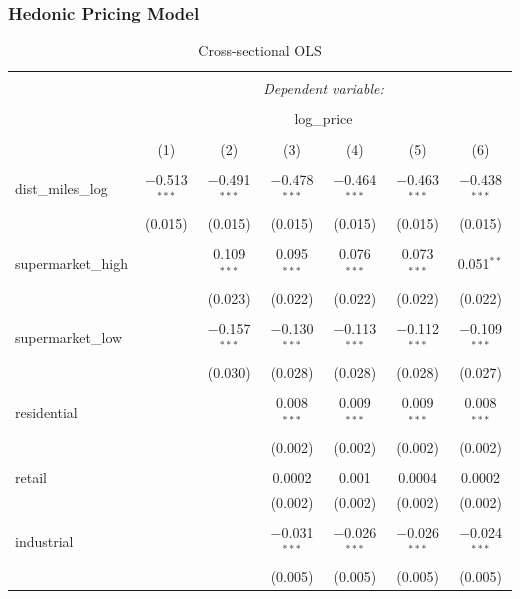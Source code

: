 \documentclass{article}
\begin{document}
\subsubsection{Hedonic Pricing Model}
\begin{table}[H] \centering 
  \caption{Cross-sectional OLS} 
  \label{} 
\small 
\begin{tabular}{@{\extracolsep{-10pt}}lcccccc} 
\\[-1.8ex]\hline 
\hline \\[-1.8ex] 
 & \multicolumn{6}{c}{\textit{Dependent variable:}} \\ 
\cline{2-7} 
\\[-1.8ex] & \multicolumn{6}{c}{log\_price} \\ 
\\[-1.8ex] & (1) & (2) & (3) & (4) & (5) & (6)\\ 
\hline \\[-1.8ex] 
 dist\_miles\_log & $-$0.513$^{***}$ & $-$0.491$^{***}$ & $-$0.478$^{***}$ & $-$0.464$^{***}$ & $-$0.463$^{***}$ & $-$0.438$^{***}$ \\ 
  & (0.015) & (0.015) & (0.015) & (0.015) & (0.015) & (0.015) \\ 
  & & & & & & \\ 
 supermarket\_high &  & 0.109$^{***}$ & 0.095$^{***}$ & 0.076$^{***}$ & 0.073$^{***}$ & 0.051$^{**}$ \\ 
  &  & (0.023) & (0.022) & (0.022) & (0.022) & (0.022) \\ 
  & & & & & & \\ 
 supermarket\_low &  & $-$0.157$^{***}$ & $-$0.130$^{***}$ & $-$0.113$^{***}$ & $-$0.112$^{***}$ & $-$0.109$^{***}$ \\ 
  &  & (0.030) & (0.028) & (0.028) & (0.028) & (0.027) \\ 
  & & & & & & \\ 
 residential &  &  & 0.008$^{***}$ & 0.009$^{***}$ & 0.009$^{***}$ & 0.008$^{***}$ \\ 
  &  &  & (0.002) & (0.002) & (0.002) & (0.002) \\ 
  & & & & & & \\ 
 retail &  &  & 0.0002 & 0.001 & 0.0004 & 0.0002 \\ 
  &  &  & (0.002) & (0.002) & (0.002) & (0.002) \\ 
  & & & & & & \\ 
 industrial &  &  & $-$0.031$^{***}$ & $-$0.026$^{***}$ & $-$0.026$^{***}$ & $-$0.024$^{***}$ \\ 
  &  &  & (0.005) & (0.005) & (0.005) & (0.005) \\ 

\end{tabular}
\end{table}
\end{document}
